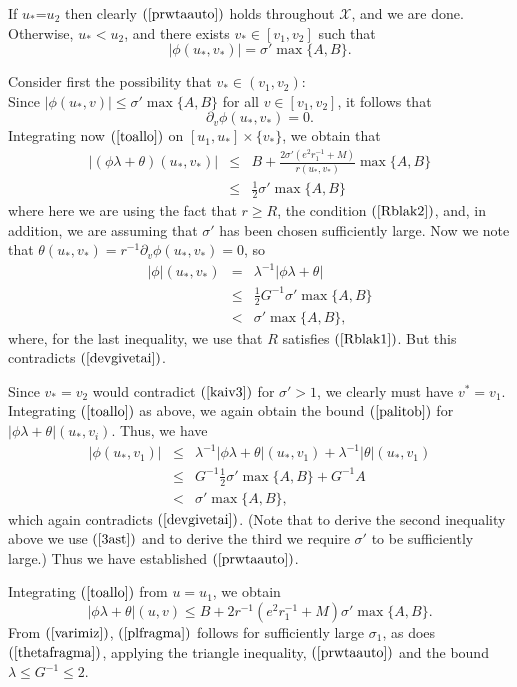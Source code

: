 \documentclass{article}
\begin{document}
If $u_*$=$u_2$ then clearly $(\ref{prwtaauto})$ holds throughout $\mathcal{X}$,
and we are done.
Otherwise, $u_*<u_2$, and there exists $v_*\in[v_1,v_{2}]$ such that
\begin{equation}
\label{devgivetai}
|\phi(u_*,v_*)|=\sigma'\max\{A,B\}.
\end{equation}

Consider first the possibility that $v_*\in(v_1,v_2)$:
\[

\]
Since $|\phi(u_*,v)|\le\sigma'\max\{A,B\}$ for all $v\in[v_1,v_2]$,
it follows that
\[
\partial_v\phi(u_*,v_*)=0.
\]
Integrating now $(\ref{toallo})$
on $[u_1,u_*]\times\{v_*\}$,
we obtain that
\begin{eqnarray}
\nonumber
\label{palitob}
|(\phi\lambda+\theta)(u_*,v_*)|	&\le&	B+\frac{2\sigma'(e^2r_1^{-1}+M)}{r(u_*,v_*)}
					\max\{A,B\}\\
				&\le&	\frac12 \sigma'\max\{A,B\}
\end{eqnarray}
where here we are using the fact that $r\ge R$, the condition
$(\ref{Rblak2})$, and, in addition, we are assuming that $\sigma'$ has
been chosen sufficiently
large. 		 	
Now we note that $\theta(u_*,v_*)=r^{-1}\partial_v\phi(u_*,v_*)=0$, so
\begin{eqnarray*}
|\phi|(u_*,v_*)	& = &	\lambda^{-1}|\phi\lambda+\theta|\\
		&\le&	\frac12G^{-1}\sigma'\max\{A,B\}\\
		& < &	 \sigma'\max\{A,B\},
\end{eqnarray*}
where, for the last inequality, we use that $R$ satisfies $(\ref{Rblak1})$.
But this contradicts $(\ref{devgivetai})$.

Since $v_*=v_2$ would contradict $(\ref{kaiv3})$ for $\sigma'>1$,
we clearly must have $v^*=v_1$.
Integrating $(\ref{toallo})$
as above, 
we again obtain the bound $(\ref{palitob})$ for $|\phi\lambda+\theta|(u_*,v_i)$. Thus,
we have
\begin{eqnarray*}
|\phi(u_*,v_1)|	&\le&	\lambda^{-1}|\phi\lambda+\theta|(u_*,v_1)+
					\lambda^{-1}|\theta|(u_*,v_1)\\
		&\le&	G^{-1}\frac12 \sigma'\max\{A,B\}
					+G^{-1}A\\
		& < &	 \sigma'\max\{A,B\},
\end{eqnarray*}
which again contradicts $(\ref{devgivetai})$. 
(Note that to derive the second inequality above we use
$(\ref{3ast})$ and to derive the third we require $\sigma'$ to be sufficiently large.)
Thus we have established $(\ref{prwtaauto})$.

Integrating $(\ref{toallo})$ from $u=u_1$, we obtain
\begin{equation}
\label{varimiz}
|\phi\lambda+\theta|(u,v)	\le	B+2r^{-1}(e^2r_1^{-1}+M)\sigma'\max\{A,B\}.
\end{equation}
From $(\ref{varimiz})$, $(\ref{plfragma})$ follows for sufficiently large $\sigma_1$,
as does $(\ref{thetafragma})$, applying the triangle inequality,
$(\ref{prwtaauto})$ and the bound
$\lambda\le G^{-1}\le 2$. 
\end{document}
